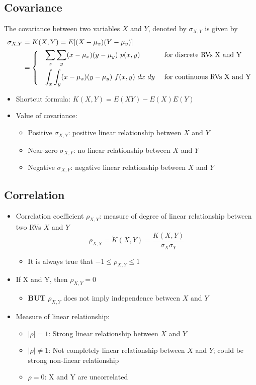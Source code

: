 \documentclass[a4paper]{article}
\begin{document}
\subsection{Covariance}
The covariance between two variables $X$ and $Y$, denoted by $\sigma_{X, Y}$ is given  by
\begin{align*}
    \sigma_{X, Y} &= K(X, Y) = E[(X-\mu_{x})(Y-\mu_{y})]\\
    &= \begin{dcases*}
    \quad \sum_{x}\sum_{y}(x-\mu_{x})(y-\mu_{y}) \ p(x, y) &\mbox{} \text{for discrete RVs X and Y}\\
    \quad \int_{x}\int_{y}(x-\mu_{x})(y-\mu_{y}) \ f(x, y) \ dx \ dy &\mbox{} \text{for continuous RVs X and Y}
    \end{dcases*}
\end{align*}
\begin{itemize}
    \item Shortcut formula: $K(X, Y) = E(XY) - E(X)E(Y)$
    \item Value of covariance:
    \begin{itemize}[label=$\circ$]
        \item Positive $\sigma_{X, Y}$: positive linear relationship between $X$ and $Y$
        \item Near-zero $\sigma_{X, Y}$: no linear relationship between $X$ and $Y$
        \item Negative $\sigma_{X, Y}$: negative linear relationship between $X$ and $Y$
    \end{itemize}
\end{itemize}
\newpage
\subsection{Correlation}
\begin{itemize}
    \item Correlation coefficient $\rho_{X, Y}$: measure of degree of linear relationship between two RVs $X$ and $Y$
    $$\rho_{X, Y} = \widetilde{K}(X, Y) = \frac{K(X, Y)}{\sigma_{X}\sigma_{Y}}
    $$
    \begin{itemize}[label=$\circ$]
        \item It is always true that $-1\leq\rho_{X, Y}\leq 1$
    \end{itemize}
    \item If X and Y, then $\rho_{X, Y} = 0$
    \begin{itemize}[label=$\circ$]
        \item \textbf{BUT} $\rho_{X, Y}$ does not imply independence between $X$ and $Y$
    \end{itemize}
    \item Measure of linear relationship:
    \begin{itemize}[label=$\circ$]
        \item $|\rho| = 1$: Strong linear relationship between $X$ and $Y$
        \item $|\rho| \neq 1$: Not completely linear relationship between $X$ and $Y$; could be strong non-linear relationship
        \item $\rho = 0$: X and Y are uncorrelated
    \end{itemize}
\end{itemize}
\end{document}

